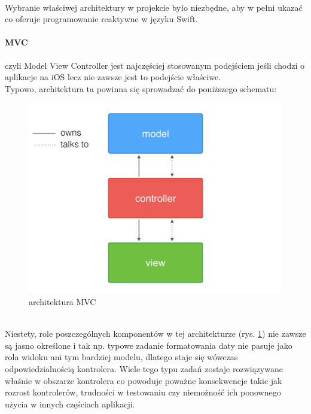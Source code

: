 \documentclass[12pt,oneside,a4paper]{report}
\begin{document}
\paragraph{}Wybranie właściwej architektury w projekcie było niezbędne, aby w pełni ukazać co oferuje programowanie reaktywne w języku Swift. 
\paragraph{MVC}czyli Model View Controller jest najczęściej stosowanym podejściem jeśli chodzi o aplikacje na iOS lecz nie zawsze jest to podejście właściwe. \\
Typowo, architektura ta powinna się sprowadzać do poniższego schematu:
	\begin{figure}[ht!]
	\centering
	\includegraphics[width=13cm]{MVC}
	\caption{architektura MVC\cite{MVC}}
	\label{MVC}
\end{figure}\\
Niestety, role poszczególnych komponentów w tej architekturze (rys. \ref{MVC}) nie zawsze są jasno określone i tak np. typowe zadanie formatowania daty nie pasuje jako rola widoku ani tym bardziej modelu, dlatego staje się wówczas odpowiedzialnością kontrolera. Wiele tego typu zadań zostaje rozwiązywane właśnie w obszarze kontrolera co powoduje poważne konsekwencje takie jak rozrost kontrolerów, trudności w testowaniu czy niemożność ich ponownego użycia w innych częściach aplikacji.
\end{document}
